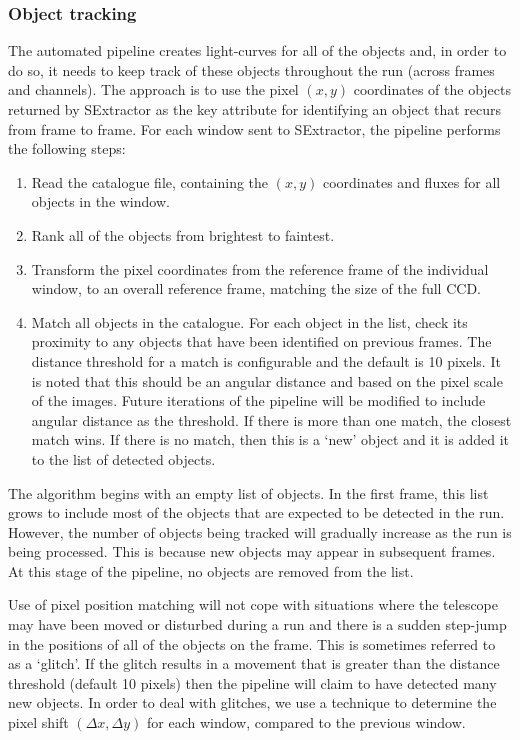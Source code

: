 \subsubsection{Object tracking}
The automated pipeline creates light-curves for all of the objects and, in order to do so, it needs to keep track of these objects throughout the run (across frames and channels). The approach is to use the pixel $(x, y)$ coordinates of the objects returned by SExtractor as the key attribute for identifying an object that recurs from frame to frame. For each window sent to SExtractor, the pipeline performs the following steps:
\begin{enumerate}
  \item{Read} the catalogue file, containing the $(x, y)$ coordinates and fluxes for all objects in the window.
  \item{Rank} all of the objects from brightest to faintest.
  \item{Transform} the pixel coordinates from the reference frame of the individual window, to an overall reference frame, matching the size of the full CCD. 
  \item{Match} all objects in the catalogue. For each object in the list, check its proximity to any objects that have been identified on previous frames. The distance threshold for a match is configurable and the default is 10 pixels. It is noted that this should be an angular distance and based on the pixel scale of the images. Future iterations of the pipeline will be modified to include angular distance as the threshold. If there is more than one match, the closest match wins. If there is no match, then this is a `new' object and it is added it to the list of detected objects.  
\end{enumerate}

The algorithm begins with an empty list of objects. In the first frame, this list grows to include most of the objects that are expected to be detected in the run. However, the number of objects being tracked will gradually increase as the run is being processed. This is because new objects may appear in subsequent frames. At this stage of the pipeline, no objects are removed from the list. 

Use of pixel position matching will not cope with situations where the telescope may have been moved or disturbed during a run and there is a sudden step-jump in the positions of all of the objects on the frame. This is sometimes referred to as a `glitch'. If the glitch results in a movement that is greater than the distance threshold (default 10 pixels) then the pipeline will claim to have detected many new objects. In order to deal with glitches, we use a technique to determine the pixel shift $(\Delta x, \Delta y)$ for each window, compared to the previous window. 

